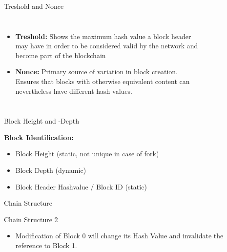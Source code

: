 \documentclass[]{beamer}
\begin{document}
\begin{frame}{Treshold and Nonce}
\begin{columns}
\begin{itemize}
	\item \textbf{Treshold:} Shows the maximum hash value a block header may have in order to be considered valid by the network and become part of the blockchain
	\item \textbf{Nonce:} Primary source of variation in block creation. Ensures that blocks with otherwise equivalent content can nevertheless have different hash values.
\end{itemize}
\begin{figure}
	
\end{figure}
\end{columns}
\end{frame}


\begin{frame}{Block Height and -Depth}
\begin{figure}
	
\end{figure}
\textbf{Block Identification:}
\begin{itemize}
 \item Block Height (static, not unique in case of fork)
 \item Block Depth (dynamic)
 \item Block Header Hashvalue / Block ID (static)
\end{itemize}
\end{frame}


\begin{frame}{Chain Structure}

\begin{figure}
	
\end{figure}
\end{frame}


\begin{frame}{Chain Structure 2}

\begin{figure}
	
\end{figure}
\begin{itemize}
\item Modification of Block 0 will change its Hash Value and invalidate the reference to Block 1.
\end{itemize}
\end{frame}
\end{document}
